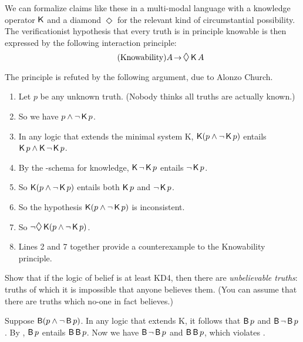 We can formalize claims like these in a multi-modal language with a knowledge
operator $\operatorname{\mathsf{K}{}}$ and a diamond $\Diamond$ for the relevant kind of circumstantial
possibility. The verificationist hypothesis that every truth is in principle
knowable is then expressed by the following interaction principle:
%
\begin{equation}\tag{Knowability}
  A \to \Diamond \Kn A
\end{equation}

The principle is refuted by the following argument, due to Alonzo Church.

\begin{enumerate}[leftmargin=10mm]
  \itemsep-1mm
  \item Let $p$ be any unknown truth. (Nobody thinks all truths are actually
        known.)
  \item So we have $p \land \neg \operatorname{\mathsf{K}{}} p$.
  \item In any logic that extends the minimal system K,
        $\operatorname{\mathsf{K}{}}(p \land \neg \operatorname{\mathsf{K}{}} p)$ entails $\operatorname{\mathsf{K}{}} p \land \operatorname{\mathsf{K}{}} \neg \operatorname{\mathsf{K}{}} p$.
  \item By the -schema for knowledge, $\operatorname{\mathsf{K}{}} \neg \operatorname{\mathsf{K}{}} p$ entails
        $\neg \operatorname{\mathsf{K}{}} p$.
  \item So $\operatorname{\mathsf{K}{}}(p \land \neg \operatorname{\mathsf{K}{}} p)$ entails both $\operatorname{\mathsf{K}{}} p$ and $\neg \operatorname{\mathsf{K}{}} p$.
  \item So the hypothesis $\operatorname{\mathsf{K}{}}(p \land \neg \operatorname{\mathsf{K}{}} p)$ is inconsistent.
  \item So $\neg \Diamond \Kn(p \land \neg \Kn p)$.
  \item Lines 2 and 7 together provide a counterexample to the Knowability
        principle.
\end{enumerate}

\begin{exercise}
  Show that if the logic of belief is at least KD4, then there are
  \emph{unbelievable truths}: truths of which it is impossible that anyone
  believes them. (You can assume that there are truths which no-one in fact
  believes.)
\end{exercise}
\begin{solution}
  Suppose $\operatorname{\mathsf{B}}(p \land \neg \operatorname{\mathsf{B}} p)$. In any logic that extends K, it follows
  that $\operatorname{\mathsf{B}} p$ and $\operatorname{\mathsf{B}} \neg \operatorname{\mathsf{B}} p$. By , $\operatorname{\mathsf{B}} p$ entails
  $\operatorname{\mathsf{B}}\operatorname{\mathsf{B}} p$. Now we have $\operatorname{\mathsf{B}} \neg \operatorname{\mathsf{B}} p$ and $\operatorname{\mathsf{B}}\operatorname{\mathsf{B}} p$, which violates .
\end{solution}








